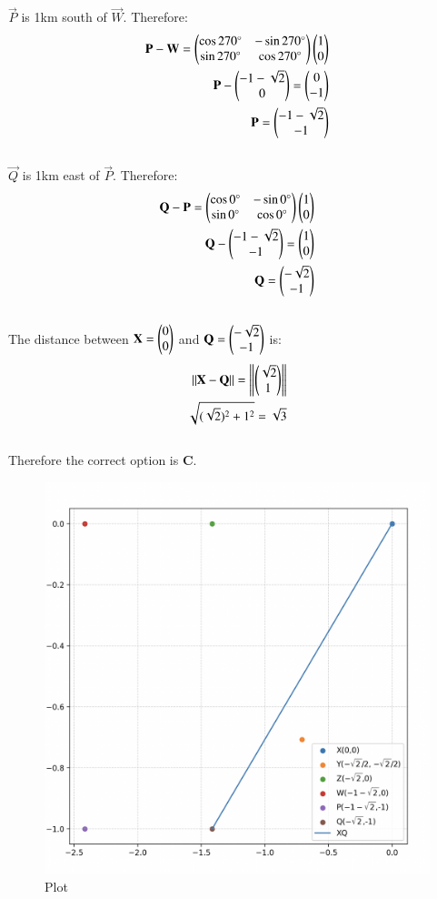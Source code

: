 \documentclass[12pt]{article}
\begin{document}
$\vec{P}$ is 1km south of $\vec{W}$. Therefore:\begin{align}
\mathbf{P}-\mathbf{W} = \begin{pmatrix}\cos270\degree & -\sin270\degree \\ \sin270\degree & \cos270\degree\end{pmatrix}\begin{pmatrix}1\\0\end{pmatrix}\\
\mathbf{P}-\begin{pmatrix}-1-\sqrt{2}\\0\end{pmatrix} = \begin{pmatrix}0\\-1\end{pmatrix}\\
\mathbf{P}=\begin{pmatrix}-1-\sqrt{2}\\-1\end{pmatrix}
\end{align}\\
$\vec{Q}$ is 1km east of $\vec{P}$. Therefore:\begin{align}
\mathbf{Q}-\mathbf{P} = \begin{pmatrix}\cos0\degree & -\sin0\degree \\ \sin0\degree & \cos0\degree\end{pmatrix}\begin{pmatrix}1\\0\end{pmatrix}\\
\mathbf{Q}-\begin{pmatrix}-1-\sqrt{2}\\-1\end{pmatrix} = \begin{pmatrix}1\\0\end{pmatrix}\\
\mathbf{Q}=\begin{pmatrix}-\sqrt{2}\\-1\end{pmatrix}
\end{align}\\
The distance between $\mathbf{X}=\begin{pmatrix}0\\0\end{pmatrix}$ and $\mathbf{Q}=\begin{pmatrix}-\sqrt{2}\\-1\end{pmatrix}$ is:
\begin{align}
    ||\mathbf{X} - \mathbf{Q}||= \left\lVert\begin{pmatrix}\sqrt{2}\\1\end{pmatrix}\right\rVert \\
    \sqrt{(\sqrt{2})^2 +1^2} = \sqrt{3}
\end{align}\\
Therefore the correct option is \textbf{C}.


\begin{figure}[H]
    \centering
    \includegraphics[width=0.8\columnwidth]{Figs/1218.png}
    \caption{Plot}
    \label{fig:placeholder}
\end{figure}
\end{document}
